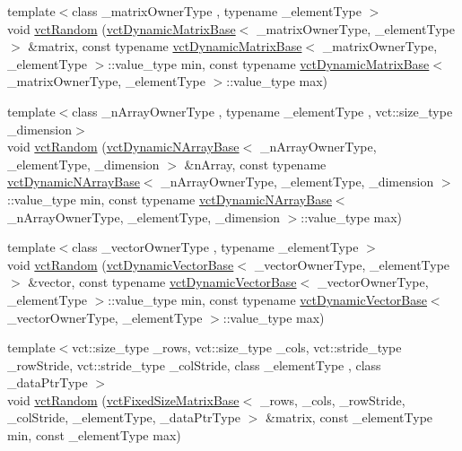\begin{DoxyCompactItemize}
\item 
{\footnotesize template$<$class \+\_\+matrix\+Owner\+Type , typename \+\_\+element\+Type $>$ }\\void \hyperlink{group__cisst_vector_ga0d25660a2dc6ef9c093f6f6b2804d2d0}{vct\+Random} (\hyperlink{classvct_dynamic_matrix_base}{vct\+Dynamic\+Matrix\+Base}$<$ \+\_\+matrix\+Owner\+Type, \+\_\+element\+Type $>$ \&matrix, const typename \hyperlink{classvct_dynamic_matrix_base}{vct\+Dynamic\+Matrix\+Base}$<$ \+\_\+matrix\+Owner\+Type, \+\_\+element\+Type $>$\+::value\+\_\+type min, const typename \hyperlink{classvct_dynamic_matrix_base}{vct\+Dynamic\+Matrix\+Base}$<$ \+\_\+matrix\+Owner\+Type, \+\_\+element\+Type $>$\+::value\+\_\+type max)
\item 
{\footnotesize template$<$class \+\_\+n\+Array\+Owner\+Type , typename \+\_\+element\+Type , vct\+::size\+\_\+type \+\_\+dimension$>$ }\\void \hyperlink{group__cisst_vector_gaebf3255543621d7ad303e4a6d381b32d}{vct\+Random} (\hyperlink{classvct_dynamic_n_array_base}{vct\+Dynamic\+N\+Array\+Base}$<$ \+\_\+n\+Array\+Owner\+Type, \+\_\+element\+Type, \+\_\+dimension $>$ \&n\+Array, const typename \hyperlink{classvct_dynamic_n_array_base}{vct\+Dynamic\+N\+Array\+Base}$<$ \+\_\+n\+Array\+Owner\+Type, \+\_\+element\+Type, \+\_\+dimension $>$\+::value\+\_\+type min, const typename \hyperlink{classvct_dynamic_n_array_base}{vct\+Dynamic\+N\+Array\+Base}$<$ \+\_\+n\+Array\+Owner\+Type, \+\_\+element\+Type, \+\_\+dimension $>$\+::value\+\_\+type max)
\item 
{\footnotesize template$<$class \+\_\+vector\+Owner\+Type , typename \+\_\+element\+Type $>$ }\\void \hyperlink{group__cisst_vector_ga2d450588b013a15e9b92489bcb7c59d1}{vct\+Random} (\hyperlink{classvct_dynamic_vector_base}{vct\+Dynamic\+Vector\+Base}$<$ \+\_\+vector\+Owner\+Type, \+\_\+element\+Type $>$ \&vector, const typename \hyperlink{classvct_dynamic_vector_base}{vct\+Dynamic\+Vector\+Base}$<$ \+\_\+vector\+Owner\+Type, \+\_\+element\+Type $>$\+::value\+\_\+type min, const typename \hyperlink{classvct_dynamic_vector_base}{vct\+Dynamic\+Vector\+Base}$<$ \+\_\+vector\+Owner\+Type, \+\_\+element\+Type $>$\+::value\+\_\+type max)
\item 
{\footnotesize template$<$vct\+::size\+\_\+type \+\_\+rows, vct\+::size\+\_\+type \+\_\+cols, vct\+::stride\+\_\+type \+\_\+row\+Stride, vct\+::stride\+\_\+type \+\_\+col\+Stride, class \+\_\+element\+Type , class \+\_\+data\+Ptr\+Type $>$ }\\void \hyperlink{group__cisst_vector_ga51016885c0db42365f594f909b6e148c}{vct\+Random} (\hyperlink{classvct_fixed_size_matrix_base}{vct\+Fixed\+Size\+Matrix\+Base}$<$ \+\_\+rows, \+\_\+cols, \+\_\+row\+Stride, \+\_\+col\+Stride, \+\_\+element\+Type, \+\_\+data\+Ptr\+Type $>$ \&matrix, const \+\_\+element\+Type min, const \+\_\+element\+Type max)

\end{DoxyCompactItemize}

